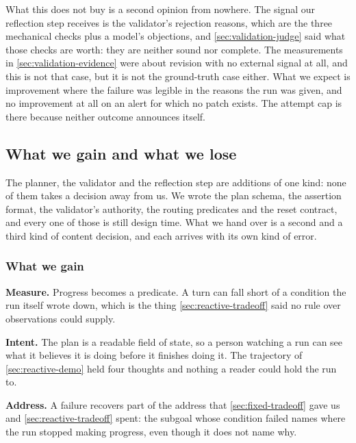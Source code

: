 What this does not buy is a second opinion from nowhere. The signal our reflection step receives is
the validator's rejection reasons, which are the three mechanical checks plus a model's objections,
and \cref{sec:validation-judge} said what those checks are worth: they are neither sound nor
complete. The measurements in \cref{sec:validation-evidence} were about revision with no external
signal at all, and this is not that case, but it is not the ground-truth case either. What we expect
is improvement where the failure was legible in the reasons the run was given, and no improvement at
all on an alert for which no patch exists. The attempt cap is there because neither outcome
announces itself.

\subsection{What we gain and what we lose}
\label{sec:planning-tradeoff}
\label{sec:validation-tradeoff}

The planner, the validator and the reflection step are additions of one kind: none of them takes a
decision away from us. We wrote the plan schema, the assertion format, the validator's authority,
the routing predicates and the reset contract, and every one of those is still design time. What we
hand over is a second and a third kind of content decision, and each arrives with its own kind of
error.

\subsubsection{What we gain}

\bi

\item \textbf{Measure.} Progress becomes a predicate. A turn can fall short of a condition the run
itself wrote down, which is the thing \cref{sec:reactive-tradeoff} said no rule over observations
could supply.

\item \textbf{Intent.} The plan is a readable field of state, so a person watching a run can see
what it believes it is doing before it finishes doing it. The trajectory of \cref{sec:reactive-demo}
held four thoughts and nothing a reader could hold the run to.

\item \textbf{Address.} A failure recovers part of the address that \cref{sec:fixed-tradeoff} gave
us and \cref{sec:reactive-tradeoff} spent: the subgoal whose condition failed names where the run
stopped making progress, even though it does not name why.

